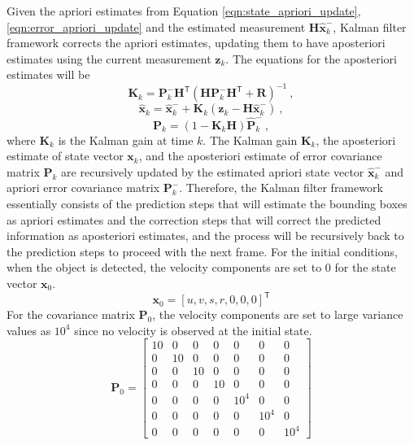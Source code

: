 Given the apriori estimates from Equation \eqref{eqn:state_apriori_update}, \eqref{eqn:error_apriori_update} and the estimated measurement $\mathbf{H} \mathbf{\hat{x}}_{k}^-$, Kalman filter framework corrects the apriori estimates, updating them to have aposteriori estimates using the current measurement $\mathbf{z}_k$. The equations for the aposteriori estimates will be
\begin{equation}
\mathbf{K}_{k} = \mathbf{P}_{k}^{-} \mathbf{H}^\mathsf{T} (\mathbf{H} \mathbf{P}_{k}^{-} \mathbf{H}^\mathsf{T} + \mathbf{R} )^{-1} ~ ,
\label{eqn:Kalman_gain_update}
\end{equation}
\begin{equation}
\mathbf{\hat{x}}_{k} = \mathbf{\hat{x}}_{k}^- + \mathbf{K}_{k} (\mathbf{z}_k - \mathbf{H} \mathbf{\hat{x}}_{k}^-) ~ ,
\label{eqn:state_aposteriori_estimate}
\end{equation}
\begin{equation}
\mathbf{P}_k = (1 - \mathbf{K}_k \mathbf{H} ) \mathbf{\hat{P}}_k^- ~ ,
\label{eqn:error_aposteriori_estimate}
\end{equation}
where $\mathbf{K}_{k}$ is the Kalman gain at time $k$. The Kalman gain $\mathbf{K}_k$, the aposteriori estimate of state vector $\mathbf{x}_k$, and the aposteriori estimate of error covariance matrix $\mathbf{P}_k$ are recursively updated by the estimated apriori state vector $\mathbf{\hat{x}}_{k}^{-}$ and apriori error covariance matrix $\mathbf{P}_{k}^{-}$. Therefore, the Kalman filter framework essentially consists of the prediction steps that will estimate the bounding boxes as apriori estimates and the correction steps that will correct the predicted information as aposteriori estimates, and the process will be recursively back to the prediction steps to proceed with the next frame. For the initial conditions, when the object is detected, the velocity components are set to 0 for the state vector $\mathbf{x}_0$.
\begin{equation}
\mathbf{x}_{0} = [u, v, s, r, 0, 0, 0]^\mathsf{T}
\label{eqn:x_0}
\end{equation}
For the covariance matrix $\mathbf{P}_0$, the velocity components are set to large variance values as $10^4$ since no velocity is observed at the initial state.
\begin{equation}
\mathbf{P}_0 = \left[ \begin{matrix}   
  10  &  0  &  0  &  0  &  0  &  0  &  0 \\
  0  &  10  &  0  &  0  &  0  &  0  &  0 \\
  0  &  0  &  10  &  0  &  0  &  0  &  0 \\
  0  &  0  &  0  &  10  &  0  &  0  &  0 \\
  0  &  0  &  0  &  0  &  10^4  &  0  &  0 \\
  0  &  0  &  0  &  0  &  0  &  10^4  &  0 \\
  0  &  0  &  0  &  0  &  0  &  0  &  10^4 
  \end{matrix} \right]
\label{eqn:P_0}
\end{equation}
